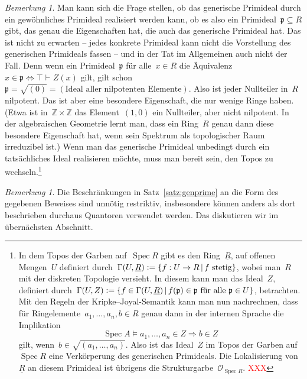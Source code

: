 \documentclass[a4paper,ngerman,12pt]{scrartcl}
\theoremstyle{definition}
\theoremstyle{plain}
\theoremstyle{remark}
\newtheorem{bem}[defn]{Bemerkung}
\newcommand{\ZZ}{\mathbb{Z}}
\newcommand{\pp}{\mathfrak{p}}
\renewcommand{\O}{\mathcal{O}}
\newcommand{\ul}[1]{\underline{#1}}
\DeclareMathOperator{\Spec}{Spec}
\newcommand{\seq}[1]{\mathrel{\vdash\!\!\!_{#1}}}
\renewcommand{\_}{\mathpunct{.}\,}
\newcommand{\?}{\,{:}\,}
\newcommand{\XXX}[1]{\textcolor{red}{#1}}
\newcommand{\defeq}{\vcentcolon=}
\begin{document}
\begin{bem}
Man kann sich die Frage stellen, ob das generische Primideal durch ein
gewöhnliches Primideal realisiert werden kann, ob es also ein Primideal~$\pp
\subseteq R$ gibt, das genau die Eigenschaften hat, die auch das generische
Primideal hat. Das ist nicht zu erwarten -- jedes konkrete Primideal kann nicht
die Vorstellung des generischen Primideals fassen -- und in der Tat im
Allgemeinen auch nicht der Fall. Denn wenn ein Primideal~$\pp$ für alle~$x \in
R$ die Äquivalenz
$x \in \pp \Leftrightarrow \top \seq{} Z(x)$
gilt, gilt schon~$\pp = \sqrt{(0)} = (\text{Ideal aller nilpotenten
Elemente})$. Also ist jeder Nullteiler in~$R$ nilpotent. Das ist aber eine
besondere Eigenschaft, die nur wenige Ringe haben. (Etwa ist in~$\ZZ \times
\ZZ$ das Element~$(1,0)$ ein Nullteiler, aber nicht nilpotent. In der
algebraischen Geometrie lernt man, dass ein Ring~$R$ genau dann diese besondere
Eigenschaft hat, wenn sein Spektrum als topologischer Raum irreduzibel ist.)
Wenn man das generische Primideal unbedingt durch ein tatsächliches Ideal
realisieren möchte, muss man bereit sein, den Topos zu wechseln.\footnote{In dem
Topos der Garben auf~$\Spec R$ gibt es den Ring~$\ul{R}$, auf offenen
Mengen~$U$ definiert durch~$\Gamma(U,\ul{R}) \defeq \{ f : U \to R \,|\, \text{$f$
stetig} \}$, wobei man~$R$ mit der diskreten Topologie versieht. In diesem kann
man das Ideal~$Z$, definiert durch~$\Gamma(U,Z) \defeq \{ f \in
\Gamma(U,\ul{R}) \,|\, \text{$f(\pp) \in \pp$ für alle~$\pp \in U$} \}$,
betrachten. Mit den Regeln der Kripke--Joyal-Semantik kann man nun nachrechnen,
dass für Ring\-elemen\-te~$a_1,\ldots,a_n, b \in R$ genau dann in der internen
Sprache die Implikation
\[ \Spec A \models a_1,\ldots,a_n \in Z \Rightarrow b \in Z \]
gilt, wenn~$b \in \sqrt{(a_1,\ldots,a_n)}$. Also ist das Ideal~$Z$ im Topos der
Garben auf~$\Spec R$ eine Verkörperung des generischen Primideals. Die
Lokalisierung von~$\ul{R}$ an diesem Primideal ist übrigens die
Strukturgarbe~$\O_{\Spec R}$. \XXX{XXX}}
\end{bem}

\begin{bem}Die Beschränkungen in Satz~\ref{satz:genprime} an die Form des
gegebenen Beweises sind unnötig restriktiv, insbesondere können anders als dort
beschrieben durchaus Quantoren verwendet werden. Das diskutieren wir im
übernächsten Abschnitt.\end{bem}
\end{document}
